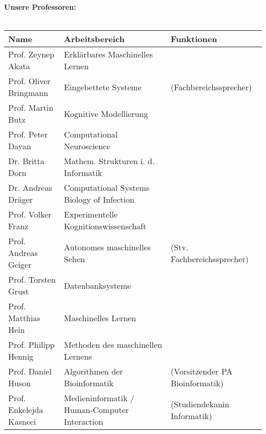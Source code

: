 \renewcommand{\arraystretch}{1}
\scriptsize
\textbf{Unsere Professoren:}\\\\
\begin{tabular}{|lll|}
	\hline
	Name                             & Arbeitsbereich                                        & Funktionen                               \\
	\hline
	\hline
	Prof. Zeynep Akata               & Erklärbares Maschinelles Lernen                       &                                          \\
	Prof. Oliver Bringmann           & Eingebettete Systeme                                  & (Fachbereichssprecher)                   \\
	Prof. Martin Butz                & Kognitive Modellierung                                &                                          \\
	Prof. Peter Dayan                & Computational Neuroscience                            &                                          \\
	Dr. Britta Dorn                  & Mathem. Strukturen i. d. Informatik                   &                                          \\
	Dr. Andreas Dräger               & Computational Systems Biology of Infection            &                                          \\
	Prof. Volker Franz               & Experimentelle Kognitionswissenschaft                 &                                          \\
	Prof. Andreas Geiger             & Autonomes maschinelles Sehen                          & (Stv. Fachbereichssprecher)              \\
	Prof. Torsten Grust              & Datenbanksysteme                                      &                                          \\
	Prof. Matthias Hein              & Maschinelles Lernen                                   &                                          \\
	Prof. Philipp Hennig             & Methoden des maschinellen Lernens                     &                                          \\
	Prof. Daniel Huson               & Algorithmen der Bioinformatik                         & (Vorsitzender PA Bioinformatik)          \\
	Prof. Enkelejda Kasneci          & Medieninformatik / Human-Computer Interaction         & (Studiendekanin Informatik\footnotemark) \\

\end{tabular}
